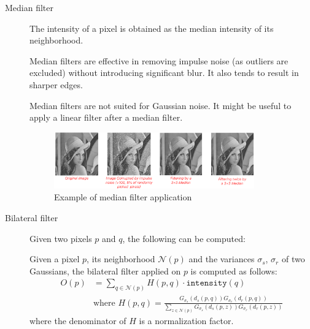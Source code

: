 \begin{description}
    \item[Median filter] 
        The intensity of a pixel is obtained as the median intensity of its neighborhood.

        \begin{remark}
            Median filters are effective in removing impulse noise (as outliers are excluded) without introducing significant blur.
            It also tends to result in sharper edges.
        \end{remark}

        \begin{remark}
            Median filters are not suited for Gaussian noise.
            It might be useful to apply a linear filter after a median filter.
        \end{remark}

        \begin{figure}[H]
            \centering
            \includegraphics[width=0.85\textwidth]{./img/_median_filter_example.pdf}
            \caption{Example of median filter application}
        \end{figure}


    \item[Bilateral filter] 
        Given two pixels $p$ and $q$, the following can be computed:

        Given a pixel $p$, its neighborhood $\mathcal{N}(p)$ and the variances $\sigma_s$, $\sigma_r$ of two Gaussians,
        the bilateral filter applied on $p$ is computed as follows:
        \[ 
            \begin{split}
                O(p) &= \sum_{q \in \mathcal{N}(p)} H(p, q) \cdot \texttt{intensity}(q) \\
                &\text{where } H(p, q) = \frac{G_{\sigma_s}(d_s(p, q)) G_{\sigma_r}(d_r(p, q))}{\sum_{z \in \mathcal{N}(p)} G_{\sigma_s}(d_s(p, z)) G_{\sigma_r}(d_r(p, z))}
            \end{split}    
        \]
        where the denominator of $H$ is a normalization factor.


\end{description}
